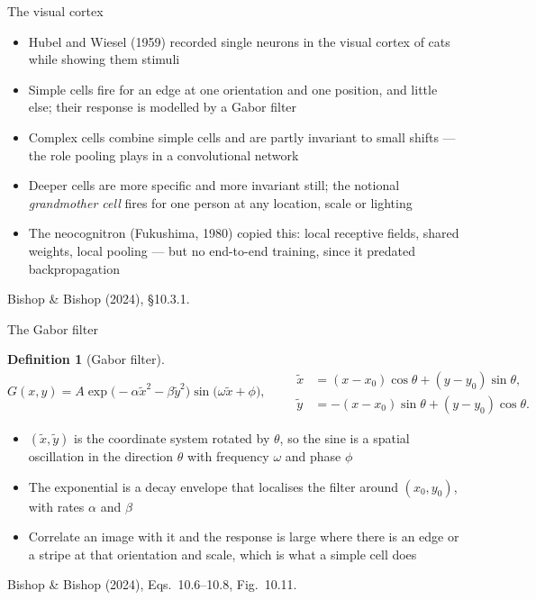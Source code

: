\documentclass[aspectratio=169, 11pt]{beamer}
\newtheorem{defx}[theorem]{Definition}
\newcommand{\srcline}[1]{%
  \par\vspace{0.25em}%
  {\scriptsize\color{mcMuted}\hfill #1\par}}
\begin{document}
\begin{frame}{The visual cortex}
  \vspace{0.1em}
  {\footnotesize
  \begin{itemize}\itemsep0.28em
    \item Hubel and Wiesel (1959) recorded single neurons in the visual
          cortex of cats while showing them stimuli
    \item \alert{Simple cells} fire for an edge at one orientation and
          one position, and little else; their response is modelled by
          a Gabor filter
    \item \alert{Complex cells} combine simple cells and are partly
          invariant to small shifts --- the role pooling plays in a
          convolutional network
    \item Deeper cells are more specific and more invariant still; the
          notional \emph{grandmother cell} fires for one person at any
          location, scale or lighting
    \item The neocognitron (Fukushima, 1980) copied this: local
          receptive fields, shared weights, local pooling --- but no
          end-to-end training, since it predated backpropagation
  \end{itemize}}
  \srcline{Bishop \& Bishop (2024), \S10.3.1.}
\end{frame}

\begin{frame}{The Gabor filter}
  \vspace{-0.3em}
  \begin{defx}[Gabor filter]\label{th:gabor}
    \small
    \[
      G(x, y) = A \exp\!\big( -\alpha \tilde{x}^2 - \beta \tilde{y}^2 \big)
                \sin\!\big( \omega \tilde{x} + \phi \big),
      \qquad
      \begin{aligned}
        \tilde{x} &= (x - x_0)\cos\theta + (y - y_0)\sin\theta,\\
        \tilde{y} &= -(x - x_0)\sin\theta + (y - y_0)\cos\theta.
      \end{aligned}
    \]
  \end{defx}
  \vspace{0.05em}
  {\footnotesize
  \begin{itemize}\itemsep0.22em
    \item $(\tilde{x}, \tilde{y})$ is the coordinate system rotated by
          $\theta$, so the sine is a spatial oscillation in the
          direction $\theta$ with frequency $\omega$ and phase $\phi$
    \item The exponential is a decay envelope that localises the
          filter around $(x_0, y_0)$, with rates $\alpha$ and $\beta$
    \item Correlate an image with it and the response is large where
          there is an edge or a stripe at that orientation and scale,
          which is what a simple cell does
  \end{itemize}}
  \srcline{Bishop \& Bishop (2024), Eqs.~10.6--10.8, Fig.~10.11.}
\end{frame}
\end{document}
